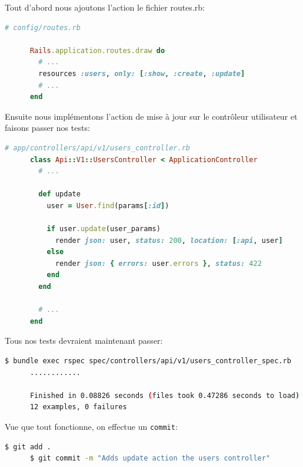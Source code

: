 \documentclass[]{report}
\begin{document}
      Tout d'abord nous ajoutons l'action le fichier routes.rb:

      \begin{scriptsize}
      \begin{lstlisting}[language=ruby]
      # config/routes.rb

      Rails.application.routes.draw do
        # ...
        resources :users, only: [:show, :create, :update]
        # ...
      end
      \end{lstlisting}
      \end{scriptsize}

      Ensuite nous implémentons l'action de mise à jour sur le contrôleur utilisateur et faisons passer nos tests:

      \begin{scriptsize}
      \begin{lstlisting}[language=ruby]
      # app/controllers/api/v1/users_controller.rb
      class Api::V1::UsersController < ApplicationController
        # ...

        def update
          user = User.find(params[:id])

          if user.update(user_params)
            render json: user, status: 200, location: [:api, user]
          else
            render json: { errors: user.errors }, status: 422
          end
        end

        # ...
      end
      \end{lstlisting}
      \end{scriptsize}

      Tous nos tests devraient maintenant passer:

      \begin{scriptsize}
      \begin{lstlisting}[language=bash]
      $ bundle exec rspec spec/controllers/api/v1/users_controller_spec.rb
      ............

      Finished in 0.08826 seconds (files took 0.47286 seconds to load)
      12 examples, 0 failures
      \end{lstlisting}
      \end{scriptsize}

      Vue que tout fonctionne, on effectue un \verb|commit|:

      \begin{scriptsize}
      \begin{lstlisting}[language=bash]
      $ git add .
      $ git commit -m "Adds update action the users controller"
      \end{lstlisting}
      \end{scriptsize}
\end{document}
